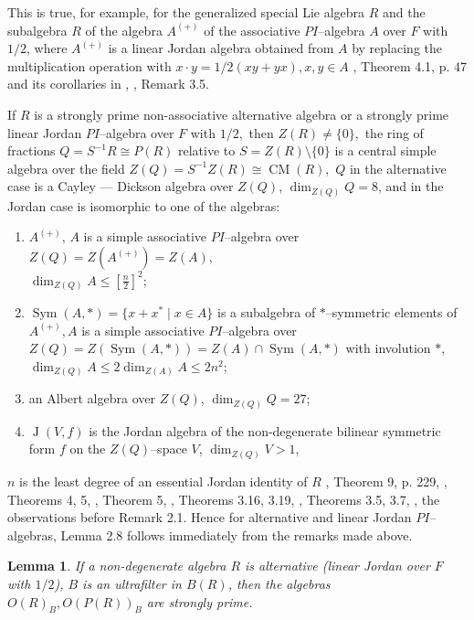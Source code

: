 \documentclass[a4paper,11pt]{article}
\newtheorem{lemma}[defi]{Lemma}
\DeclareMathOperator{\Sym}{Sym}
\DeclareMathOperator{\CM}{CM}
\DeclareMathOperator{\Jr}{J}
\begin{document}
This is true, for example, for the generalized special Lie algebra $R$ and the 
subalgebra $R$ of the algebra $A^{(+)}$ of the associative $PI$--algebra $A$ 
over $F$ with $1/2$, where $A^{(+)}$ is a linear Jordan algebra obtained from 
$A$ by replacing the multiplication operation with 
${x\cdot y=1/2(x y+y x), x, y\in A}$ \cite{Raz}, Theorem 4.1, p. 47 and 
its corollaries in \cite{BP}, \cite{Gol6}, Remark 3.5. 

If $R$ is a strongly prime non-associative alternative algebra or a strongly 
prime linear Jordan $PI$--algebra over $F$ with $1/2,$ then 
${Z(R)\ne \{0\},}$ the ring of fractions ${Q=S^{-1} R\cong P(R)}$ re\-lative to 
${S=Z(R)\setminus \{0\}}$ is a central simple algebra over the field 
${Z(Q)=S^{-1} Z(R)\cong \CM(R),}$ $Q$ in the alternative 
case is a Cayley --- Dickson algebra over $Z(Q)$, ${\dim_{Z(Q)} Q=8}$, and in 
the Jordan case is isomorphic to one of the algebras: 
\begin{enumerate}

\item $A^{(+)}$, $A$ is a simple associative $PI$--algebra over 
${Z(Q)=Z(A^{(+)})=Z(A)}$,\\ ${\dim_{Z(Q)} A\leq [\frac{n}2]^2}$;

\item ${\Sym(A, *)=\{x+x^*\mid x\in A\}}$ is a subalgebra of 
$*$--symmetric elements of ${A^{(+)}, A}$ is a simple associative 
$PI$--algebra over ${Z(Q)=Z(\Sym(A, *))=Z(A)\cap \Sym(A, *)}$ 
with involution $*$, ${\dim_{Z(Q)} A\leq 2 \dim_{Z(A)} A\leq 2 n^2}$;

\item an Albert algebra over $Z(Q)$, ${\dim_{Z(Q)} Q=27}$; 

\item ${\Jr(V, f)}$ is the Jordan algebra of the non-degenerate bilinear 
symmetric form $f$ on the $Z(Q)$--space $V$, ${\dim_{Z(Q)} V> 1}$,

\end{enumerate}
$n$ is the least degree of an essential Jordan identity of $R$ 
\cite{ZShS}, Theorem 9, p. 229, \cite{ZelP}, Theorems 4, 5, \cite{Am1}, 
Theorem 5, \cite{BM}, Theorems 3.16, 3.19, \cite{BM1}, Theorems 3.5, 3.7, 
\cite{Gol4}, the observations before Remark 2.1. Hence for alternative and 
linear Jordan $PI$--algebras, Lemma 2.8 follows immediately from the remarks 
made above. 

\begin{lemma}
If a non-degenerate algebra $R$ is alternative (linear Jordan over $F$ with 
$1/2$), $B$ is an ultrafilter in $B(R)$, then the algebras ${O(R)_B, 
O(P(R))_B}$ are strongly prime.
\end{lemma}
\end{document}
